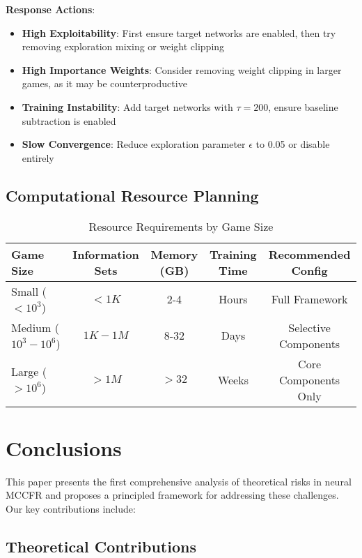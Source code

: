 \documentclass[12pt,a4paper]{article}
\begin{document}
\textbf{Response Actions}:
\begin{itemize}
\item \textbf{High Exploitability}: First ensure target networks are enabled, then try removing exploration mixing or weight clipping
\item \textbf{High Importance Weights}: Consider removing weight clipping in larger games, as it may be counterproductive
\item \textbf{Training Instability}: Add target networks with $\tau = 200$, ensure baseline subtraction is enabled
\item \textbf{Slow Convergence}: Reduce exploration parameter $\epsilon$ to 0.05 or disable entirely
\end{itemize}

\subsection{Computational Resource Planning}

\begin{table}[H]
\centering
\caption{Resource Requirements by Game Size}
\begin{tabular}{@{}lcccc@{}}
\toprule
Game Size & Information Sets & Memory (GB) & Training Time & Recommended Config \\
\midrule
Small ($< 10^3$) & $< 1K$ & 2-4 & Hours & Full Framework \\
Medium ($10^3 - 10^6$) & $1K - 1M$ & 8-32 & Days & Selective Components \\
Large ($> 10^6$) & $> 1M$ & $> 32$ & Weeks & Core Components Only \\
\bottomrule
\end{tabular}
\end{table}

\section{Conclusions}

This paper presents the first comprehensive analysis of theoretical risks in neural MCCFR and proposes a principled framework for addressing these challenges. Our key contributions include:

\subsection{Theoretical Contributions}
\end{document}
